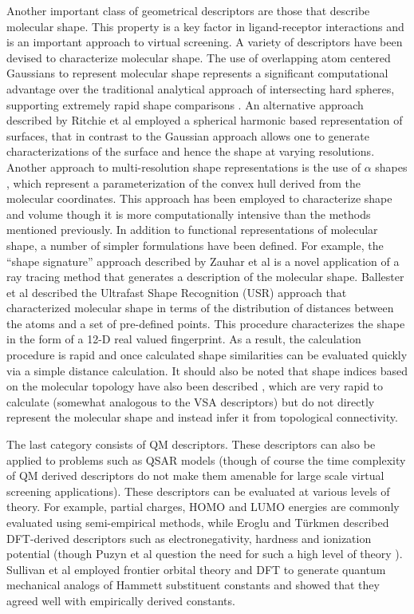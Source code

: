 \documentclass[letterpaper, 12pt]{article}
\begin{document}
Another important class of geometrical descriptors are those that
describe molecular shape. This property is a key factor in ligand-receptor interactions and is
an important approach to virtual screening. A variety of descriptors
have been devised to characterize molecular shape. The use of
overlapping atom centered Gaussians to represent molecular shape
\cite{Grant:1995aa} represents a significant computational advantage
over the traditional analytical approach of intersecting hard spheres,
supporting extremely rapid shape comparisons \cite{Grant:1999vn}. An
alternative approach described by Ritchie et al \cite{Ritchie:1999kx}
employed a spherical harmonic based representation of surfaces, that
in contrast to the Gaussian approach allows one to generate
characterizations of the surface and hence the shape at varying
resolutions. Another approach to multi-resolution shape
representations is the use of $\alpha$ shapes
\cite{Edelsbrunner:1994aa}, which represent a parameterization of the
convex hull derived from the molecular coordinates. This approach has
been employed to characterize shape and volume \cite{Wilson:2009ys}
though it is more computationally intensive than the methods mentioned
previously. In addition to functional representations of molecular
shape, a number of simpler formulations have been defined. For
example, the ``shape signature'' approach described by Zauhar et al
\cite{Zauhar:2003fk} is a novel application of a ray tracing method
that generates a description of the molecular shape. Ballester et al
\cite{Ballester:2007aa} described the Ultrafast Shape Recognition
(USR) approach that characterized molecular shape in terms of the
distribution of distances between the atoms and a set of pre-defined
points. This procedure characterizes the shape in the form of a 12-D
real valued fingerprint. As a result, the calculation procedure is
rapid and once calculated shape similarities can be evaluated quickly
via a simple distance calculation. It should also be noted that shape
indices based on the molecular topology have also been described
\cite{Kier:1985aa}, which are very rapid to calculate (somewhat
analogous to the VSA descriptors) but do not directly represent the
molecular shape and instead infer it from topological connectivity.

The last category consists of QM descriptors. These
descriptors can also be applied to problems such as QSAR models
(though of course the time complexity of QM derived descriptors do not
make them amenable for large scale virtual screening
applications). These descriptors can be evaluated at various levels of
theory. For example, partial charges, HOMO and LUMO energies are
commonly evaluated using semi-empirical methods, while Eroglu and
T\"{u}rkmen \cite{Eroglu:2007uq} described DFT-derived descriptors
such as electronegativity, hardness and ionization potential (though
Puzyn et al question the need for such a high level of theory
\cite{Puzyn:2008fk}). Sullivan et al \cite{Sullivan:2000fk} employed
frontier orbital theory and DFT to generate quantum mechanical analogs
of Hammett substituent constants \cite{Hammett:1937aa} and showed that
they agreed well with empirically derived constants.
\end{document}
